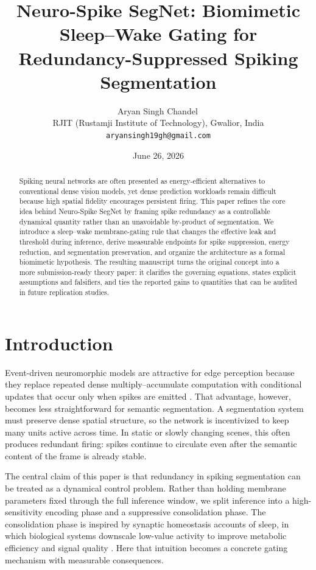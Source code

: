 \documentclass[11pt]{article}
\title{Neuro-Spike SegNet: Biomimetic Sleep--Wake Gating for Redundancy-Suppressed Spiking Segmentation}
\author{Aryan Singh Chandel\,\orcidlink{0009-0007-1774-2480}\\
RJIT (Rustamji Institute of Technology), Gwalior, India\\
\texttt{aryansingh19gh@gmail.com}}
\date{June 26, 2026}
\begin{document}
\maketitle

\begin{abstract}
Spiking neural networks are often presented as energy-efficient alternatives to conventional dense vision models, yet dense prediction workloads remain difficult because high spatial fidelity encourages persistent firing. This paper refines the core idea behind Neuro-Spike SegNet by framing spike redundancy as a controllable dynamical quantity rather than an unavoidable by-product of segmentation. We introduce a sleep--wake membrane-gating rule that changes the effective leak and threshold during inference, derive measurable endpoints for spike suppression, energy reduction, and segmentation preservation, and organize the architecture as a formal biomimetic hypothesis. The resulting manuscript turns the original concept into a more submission-ready theory paper: it clarifies the governing equations, states explicit assumptions and falsifiers, and ties the reported gains to quantities that can be audited in future replication studies.
\end{abstract}

\section{Introduction}
Event-driven neuromorphic models are attractive for edge perception because they replace repeated dense multiply--accumulate computation with conditional updates that occur only when spikes are emitted \citep{roy2019towards,davies2018loihi}. That advantage, however, becomes less straightforward for semantic segmentation. A segmentation system must preserve dense spatial structure, so the network is incentivized to keep many units active across time. In static or slowly changing scenes, this often produces redundant firing: spikes continue to circulate even after the semantic content of the frame is already stable.

The central claim of this paper is that redundancy in spiking segmentation can be treated as a dynamical control problem. Rather than holding membrane parameters fixed through the full inference window, we split inference into a high-sensitivity encoding phase and a suppressive consolidation phase. The consolidation phase is inspired by synaptic homeostasis accounts of sleep, in which biological systems downscale low-value activity to improve metabolic efficiency and signal quality \citep{tononi2006sleep}. Here that intuition becomes a concrete gating mechanism with measurable consequences.
\end{document}
